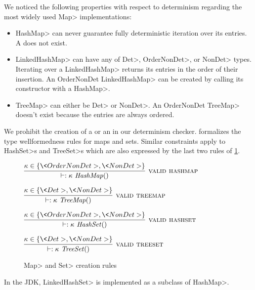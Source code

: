 We noticed the following properties with respect to determinism regarding the most widely used \<Map> implementations:
\begin{itemize}
    \item \<HashMap> can never guarantee fully deterministic iteration over its entries. A  does not exist.
    \item \<LinkedHashMap> can have any of \<Det>, \<OrderNonDet>, or \<NonDet> types. Iterating over a \<LinkedHashMap> returns
    its entries in the order of their insertion. An \<OrderNonDet LinkedHashMap> can be created by calling its constructor with a \<HashMap>.
    \item \<TreeMap> can either be \<Det> or \<NonDet>. An \<OrderNonDet TreeMap> doesn't exist because the entries are always ordered.
\end{itemize}

We prohibit the creation of a  or an  in our determinism checker.
 formalizes the type wellformedness rules for maps and sets. Similar constraints apply to \<HashSet>s and \<TreeSet>s which are
also expressed by the last two rules of \cref{fig-creation-rules}.

\begin{figure}
    $\infer[\rulename{valid hashmap}]{\vdash: \|\kappa\ HashMap()|}{\kappa \in \{ \<OrderNonDet>, \<NonDet> \}}$
    
    \bigskip
    
    $\infer[\rulename{valid treemap}]{\vdash: \|\kappa\ TreeMap()|}{\kappa \in \{ \<Det>, \<NonDet> \}}$
    
    \bigskip
    
    $\infer[\rulename{valid hashset}]{\vdash: \|\kappa\ HashSet()|}{\kappa \in \{ \<OrderNonDet>, \<NonDet> \}}$
    
    \bigskip
    
    $\infer[\rulename{valid treeset}]{\vdash: \|\kappa\ TreeSet()|}{\kappa \in \{ \<Det>, \<NonDet> \}}$
    \caption{\<Map> and \<Set> creation rules}
    \label{fig-creation-rules}
\end{figure}

In the JDK, \<LinkedHashSet> is implemented as a subclass of \<HashMap>.

